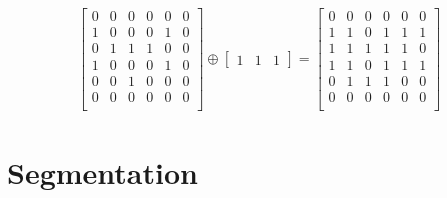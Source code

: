 \documentclass[]{article}
\begin{document}
\subsection{}
\begin{equation}\begin{aligned}
\begin{bmatrix}
0 & 0 & 0 & 0 & 0 & 0 \\
1 & 0 & 0 & 0 & 1 & 0 \\
0 & 1 & 1 & 1 & 0 & 0 \\
1 & 0 & 0 & 0 & 1 & 0 \\
0 & 0 & 1 & 0 & 0 & 0 \\
0 & 0 & 0 & 0 & 0 & 0 \\
\end{bmatrix}
\oplus
\begin{bmatrix} 1 & 1 & 1 \end{bmatrix} =
\begin{bmatrix}
0 & 0 & 0 & 0 & 0 & 0 \\
1 & 1 & 0 & 1 & 1 & 1 \\
1 & 1 & 1 & 1 & 1 & 0 \\
1 & 1 & 0 & 1 & 1 & 1 \\
0 & 1 & 1 & 1 & 0 & 0 \\
0 & 0 & 0 & 0 & 0 & 0 \\
\end{bmatrix}
\end{aligned}\end{equation}


\section{Segmentation}
\end{document}
